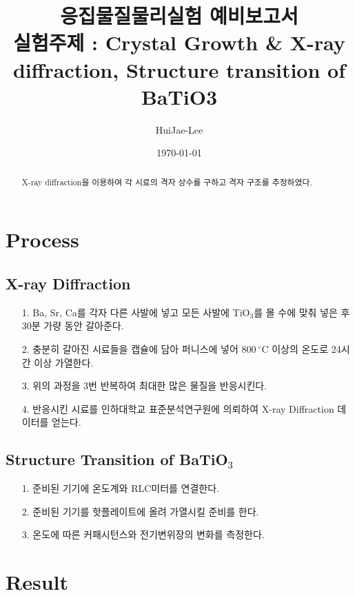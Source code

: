 \documentclass[aps,reprint,superscriptaddress,10pt]{revtex4-2}
\begin{document}
\title{응집물질물리실험 예비보고서 \\
\small 실험주제 : Crystal Growth \& X-ray diffraction,
Structure transition of BaTiO3}

\author{HuiJae-Lee}

\date{\today}

\begin{abstract}
  X-ray diffraction을 이용하여 각 시료의 격자 상수를 구하고 격자 구조를 추정하였다.
\end{abstract}

\maketitle

\section{Process}
\subsection{X-ray Diffraction}
\begin{itemize}
  \item[1. ] Ba, Sr, Ca를 각자 다른 사발에 넣고 모든 사발에 TiO$_3$를 몰 수에 맞춰 넣은 후
  30분 가량 동안 갈아준다. 
  \item[2. ] 충분히 갈아진 시료들을 캡슐에 담아 퍼니스에 넣어 $800~\mathrm{^\circ C}$ 이상의
  온도로 24시간 이상 가열한다.
  \item[3. ] 위의 과정을 3번 반복하여 최대한 많은 물질을 반응시킨다.
  \item[4. ] 반응시킨 시료를 인하대학교 표준분석연구원에 의뢰하여  X-ray Diffraction 
  데이터를 얻는다.
\end{itemize}

\subsection{Structure Transition of BaTiO$_3$}
\begin{itemize}
  \item[1. ] 준비된 기기에 온도계와 RLC미터를 연결한다.
  \item[2. ] 준비된 기기를 핫플레이트에 올려 가열시킬 준비를 한다.
  \item[3. ] 온도에 따른 커패시턴스와 전기변위장의 변화를 측정한다.
\end{itemize}
\section{Result}
\end{document}
